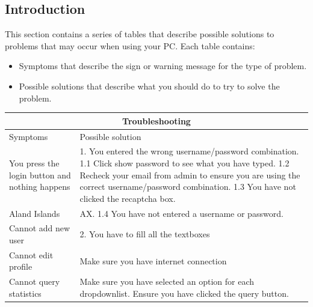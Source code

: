 \documentclass[14pt, a4paper]{article}
\begin{document}
\subsection{Introduction}
This section contains a series of tables that describe
possible solutions to problems that may occur when
using your PC. Each table contains: \\
\begin{itemize}
	\item Symptoms that describe the sign or warning message for the type of problem.
	\item Possible solutions that describe what you should
do to try to solve the problem. 
\end{itemize}

\setlength{\arrayrulewidth}{1mm}
\setlength{\tabcolsep}{18pt}
\renewcommand{\arraystretch}{1.5}
 

\begin{tabular}{ |p{3cm}|p{3cm}|  }
\hline
\multicolumn{2}{|c|}{Troubleshooting} \\
\hline
Symptoms & Possible solution \\
\hline
You press the login button and nothing happens & 1. You entered the wrong username/password combination. 1.1 Click show password to see what you have typed. 1.2 Recheck your email from admin to ensure you are using the correct username/password combination. 1.3 You have not clicked the recaptcha box. \\
Aland Islands & AX. 1.4 You have not entered a username or password. \\
Cannot add new user & 2. You have to fill all the textboxes\\
Cannot edit profile    &Make sure you have internet connection  \\
Cannot query statistics & Make sure you have selected an option for each dropdownlist. Ensure you have clicked the query button.  \\
\hline
\end{tabular}
\end{document}
